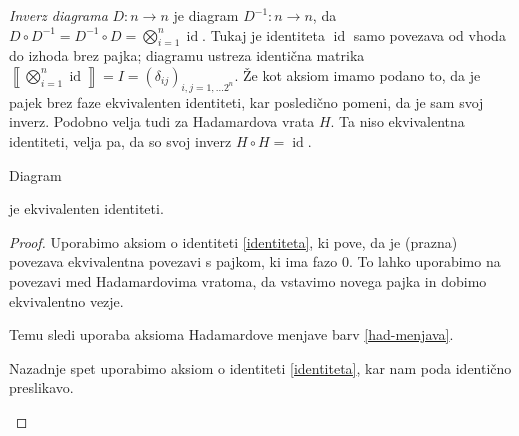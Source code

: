 \documentclass[mat1]{fmfdelo}
\newcommand{\interpret}[1]{\left\llbracket #1 \right\rrbracket}
\DeclareMathOperator*{\id}{id}
\begin{document}
\emph{Inverz diagrama} \(D:n\to n\) je diagram \(D^{-1}:n\to n\), da \(D\circ D^{-1} = D^{-1}\circ D = \bigotimes_{i=1}^n\id\). Tukaj je identiteta \(\id\) samo povezava od vhoda do izhoda brez pajka; diagramu ustreza identična matrika \(\interpret{\bigotimes_{i=1}^n\id} = I = (\delta_{ij})_{i,j=1,\ldots 2^n}\). Že kot aksiom imamo podano to, da je pajek brez faze ekvivalenten identiteti, kar posledično pomeni, da je sam svoj inverz. Podobno velja tudi za Hadamardova vrata \(H\). Ta niso ekvivalentna identiteti, velja pa, da so svoj inverz \(H\circ H = \id\).
\begin{izrek}\label{had-inverz}
    Diagram
\begin{center}
\end{center}
je ekvivalenten identiteti.
\end{izrek}
\begin{proof}

Uporabimo aksiom o identiteti \ref{identiteta}, ki pove, da je (prazna) povezava ekvivalentna povezavi s pajkom, ki ima fazo 0. To lahko uporabimo na povezavi med Hadamardovima vratoma, da vstavimo novega pajka in dobimo ekvivalentno vezje.
\begin{center}
\end{center}
Temu sledi uporaba aksioma Hadamardove menjave barv \ref{had-menjava}.
\begin{center}
\end{center}
Nazadnje spet uporabimo aksiom o identiteti \ref{identiteta}, kar nam poda identično preslikavo.
\begin{center}
\end{center}
\end{proof}
\end{document}
